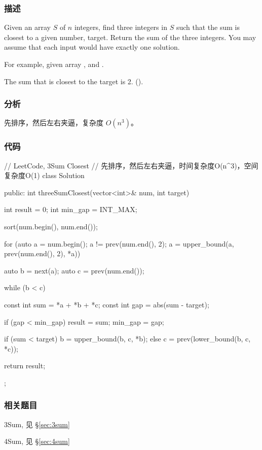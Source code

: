 \subsubsection{描述}
Given an array $S$ of $n$ integers, find three integers in $S$ such that the sum is closest to a given number, target. Return the sum of the three integers. You may assume that each input would have exactly one solution.

For example, given array , and .

The sum that is closest to the target is 2. ().


\subsubsection{分析}
先排序，然后左右夹逼，复杂度 $O(n^3)$。


\subsubsection{代码}
\begin{Code}
// LeetCode, 3Sum Closest
// 先排序，然后左右夹逼，时间复杂度O(n^3)，空间复杂度O(1)
class Solution {
public:
    int threeSumClosest(vector<int>& num, int target) {
        int result = 0;
        int min_gap = INT_MAX;

        sort(num.begin(), num.end());

        for (auto a = num.begin(); a != prev(num.end(), 2);
                a = upper_bound(a, prev(num.end(), 2), *a)) {
            auto b = next(a);
            auto c = prev(num.end());

            while (b < c) {
                const int sum = *a + *b + *c;
                const int gap = abs(sum - target);

                if (gap < min_gap) {
                    result = sum;
                    min_gap = gap;
                }

                if (sum < target)
                    b = upper_bound(b, c, *b);
                else
                    c = prev(lower_bound(b, c, *c));
            }
        }

        return result;
    }
};
\end{Code}


\subsubsection{相关题目}
\begindot
\item 3Sum, 见 \S \ref{sec:3sum}
\item 4Sum, 见 \S \ref{sec:4sum}
\myenddot



